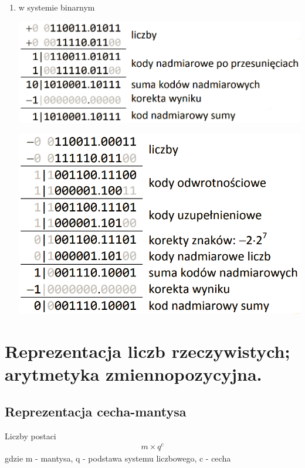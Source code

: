 \documentclass[12pt]{article}
\begin{document}
\begin{enumerate}
        \item w systemie binarnym
        \begin{center}
            \includegraphics[scale=0.4]{graphics/number-repr/nad-add-bin.png}
        \end{center}
        \begin{center}
            \includegraphics[scale=0.4]{graphics/number-repr/nad-add-bin-2.png}
        \end{center}
    \end{enumerate}






    \newpage

    \section{Reprezentacja liczb rzeczywistych; arytmetyka zmiennopozycyjna.}

    \subsection{Reprezentacja cecha-mantysa}
    Liczby postaci
    \begin{align*}
        m \times q^c
    \end{align*}
    gdzie m - mantysa, q - podstawa systemu liczbowego, c - cecha
\end{document}
